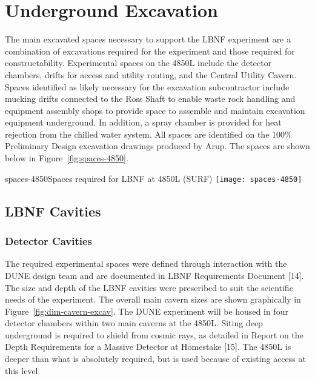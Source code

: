 \chapter{Underground Excavation}
\label{ch:fscf-excav}

The main excavated spaces necessary to support the LBNF experiment are a combination of excavations required for the experiment and those required for constructability. Experimental spaces on the 4850L include the detector chambers, drifts for access and utility routing, and the Central Utility Cavern. Spaces identified as likely necessary for the excavation subcontractor include mucking drifts connected to the Ross Shaft to enable waste rock handling and equipment assembly shops to provide space to assemble and maintain excavation equipment underground. In addition, a spray chamber is provided for heat rejection from the chilled water system. All spaces are identified on the 100\% Preliminary Design excavation drawings produced by Arup\cite{arup:fscf100pdr}. The spaces are shown below in Figure~\ref{fig:spaces-4850}.

\begin{cdrfigure}{spaces-4850}{Spaces required for LBNF at 4850L (SURF)}
\texttt{[image: spaces-4850]}
\end{cdrfigure}

\section{LBNF Cavities}
\label{sec:fscf-excav-cav}

\subsection{Detector Cavities}
\label{sec:fscf-excav-det}

The required experimental spaces were defined through interaction with the DUNE design team and are documented in LBNF Requirements Document [14]. The size and depth of the LBNF cavities were prescribed to suit the scientific needs of the experiment. The overall main cavern sizes are shown graphically in Figure~\ref{fig:dim-cavern-excav}. The DUNE experiment will be housed in four detector chambers within two main caverns at the 4850L. Siting deep underground is required to shield from cosmic rays, as detailed in Report on the Depth Requirements for a Massive Detector at Homestake [15]. The 4850L is deeper than what is absolutely required, but is used because of existing access at this level. 

